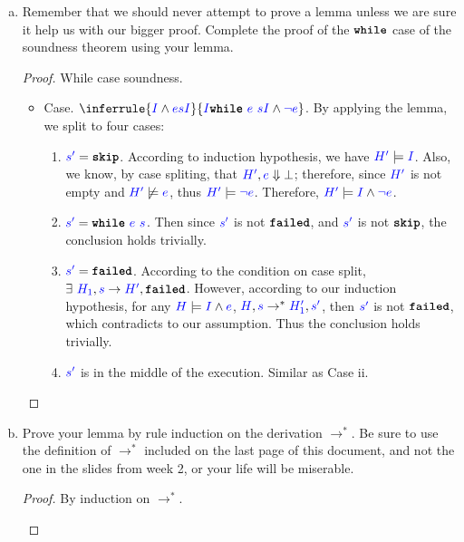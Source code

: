 \documentclass{article}
\theoremstyle{definition}
\newcommand{\meta}[1]{{\color{blue}#1}}
\newcommand{\progtext}[1]{\ensuremath{\text{\ttfamily\bfseries #1}}}
\newcommand{\impskip}{\progtext{skip}}
\newcommand{\failed}{\progtext{failed}}
\newcommand{\while}{\progtext{while}}
\begin{document}
\begin{enumerate}[start=1,label={{\bf Problem \arabic*}.},ref=\arabic*,left=0pt..0pt,widest*=10,align=left,itemindent=*]
\begin{enumerate}[(a),left=1em]
  \item Remember that we should never attempt to prove a lemma unless we are
    sure it help us with our bigger proof. Complete the proof of the $\while$
    case of the soundness theorem using your lemma.
    \begin{proof}
      While case soundness.
      \begin{itemize}
        \item Case. $\inferrule{
          \set{\meta{I}\wedge \meta{e}} \meta{s} \set{\meta{I}}
        }{\set{\meta{I}} \while\ \meta{e}\ \meta{s} \set{\meta{I} \wedge \meta{\neg e}}}$. By applying the lemma, we split to four cases:
        \begin{enumerate}
          \item $\meta{s^\prime}=\impskip$. According to induction hypothesis, we have $\meta{H^\prime}\models \meta{I}$. Also, we know, by case spliting, that $\meta{H^\prime}, \meta{e} \Downarrow \bot$; therefore, since $\meta{H^\prime}$ is not empty and $\meta{H^\prime} \not\models \meta{e}$, thus $\meta{H^\prime}\models\meta{\neg e}$. Therefore, $\meta{H^\prime} \models \set{\meta{I} \wedge \meta{\neg e}}$.
          \item $\meta{s^\prime}=\while\ \meta{e}\ \meta{s}$. Then since $\meta{s^\prime}$ is not $\failed$, and $\meta{s^\prime}$ is not $\impskip$, the conclusion holds trivially.
          \item $\meta{s^\prime}=\failed$. According to the condition on case split, $\exists\ \meta{H_1}, \meta{s} \to \meta{H^\prime}, \failed$. However, according to our induction hypothesis, for any $\meta{H} \models \set{\meta{I}\wedge \meta{e}}$, $\meta{H}, \meta{s} \to^* \meta{H_1^\prime}, \meta{s^\prime}$, then $\meta{s^\prime}$ is not $\failed$, which contradicts to our assumption. Thus the conclusion holds trivially.
          \item $\meta{s^\prime}$ is in the middle of the execution. Similar as Case ii.
        \end{enumerate}
      \end{itemize}
    \end{proof}
  \item Prove your lemma by rule induction on the derivation $\to^*$. Be sure to
    use the definition of $\to^*$ included on the last page of this document,
    and not the one in the slides from week 2, or your life will be miserable.
    \begin{proof}
      By induction on $\to^*$.
      \begin{itemize}

\end{itemize}
\end{proof}
\end{enumerate}
\end{enumerate}
\end{document}
